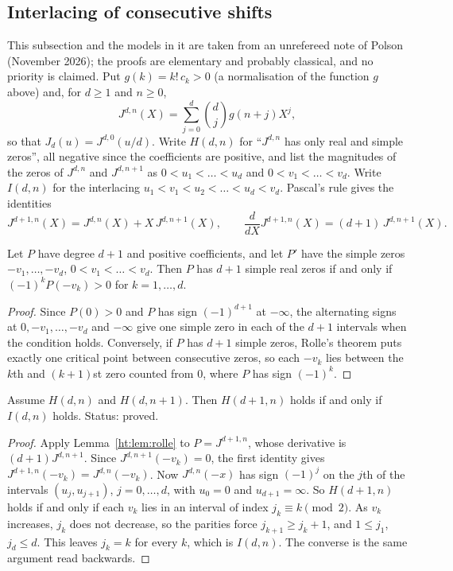 \subsection{Interlacing of consecutive shifts}\label{ht:sec:interlace}
This subsection and the models in it are taken from an unrefereed note of Polson (November 2026); the proofs are elementary and probably classical, and no priority is claimed. Put $g(k)=k!\,c_k>0$ (a normalisation of the function $g$ above) and, for $d\ge1$ and $n\ge0$,
\[
J^{d,n}(X)=\sum_{j=0}^d\binom dj g(n+j)X^j ,
\]
so that $J_d(u)=J^{d,0}(u/d)$. Write $H(d,n)$ for ``$J^{d,n}$ has only real and simple zeros'', all negative since the coefficients are positive, and list the magnitudes of the zeros of $J^{d,n}$ and $J^{d,n+1}$ as $0<u_1<\dots<u_d$ and $0<v_1<\dots<v_d$. Write $I(d,n)$ for the interlacing $u_1<v_1<u_2<\dots<u_d<v_d$. Pascal's rule gives the identities
\[
J^{d+1,n}(X)=J^{d,n}(X)+X\,J^{d,n+1}(X),\qquad \frac{d}{dX}J^{d+1,n}(X)=(d+1)\,J^{d,n+1}(X).
\]

\begin{lemma}\label{ht:lem:rolle}
Let $P$ have degree $d+1$ and positive coefficients, and let $P'$ have the simple zeros $-v_1,\dots,-v_d$, $0<v_1<\dots<v_d$. Then $P$ has $d+1$ simple real zeros if and only if $(-1)^kP(-v_k)>0$ for $k=1,\dots,d$.
\end{lemma}

\begin{proof}
Since $P(0)>0$ and $P$ has sign $(-1)^{d+1}$ at $-\infty$, the alternating signs at $0,-v_1,\dots,-v_d$ and $-\infty$ give one simple zero in each of the $d+1$ intervals when the condition holds. Conversely, if $P$ has $d+1$ simple zeros, Rolle's theorem puts exactly one critical point between consecutive zeros, so each $-v_k$ lies between the $k$th and $(k+1)$st zero counted from $0$, where $P$ has sign $(-1)^k$.
\end{proof}

\begin{theorem}\label{ht:thm:interlace}
Assume $H(d,n)$ and $H(d,n+1)$. Then $H(d+1,n)$ holds if and only if $I(d,n)$ holds. Status: proved.
\end{theorem}

\begin{proof}
Apply Lemma~\ref{ht:lem:rolle} to $P=J^{d+1,n}$, whose derivative is $(d+1)J^{d,n+1}$. Since $J^{d,n+1}(-v_k)=0$, the first identity gives $J^{d+1,n}(-v_k)=J^{d,n}(-v_k)$. Now $J^{d,n}(-x)$ has sign $(-1)^j$ on the $j$th of the intervals $(u_j,u_{j+1})$, $j=0,\dots,d$, with $u_0=0$ and $u_{d+1}=\infty$. So $H(d+1,n)$ holds if and only if each $v_k$ lies in an interval of index $j_k\equiv k\pmod2$. As $v_k$ increases, $j_k$ does not decrease, so the parities force $j_{k+1}\ge j_k+1$, and $1\le j_1$, $j_d\le d$. This leaves $j_k=k$ for every $k$, which is $I(d,n)$. The converse is the same argument read backwards.
\end{proof}

